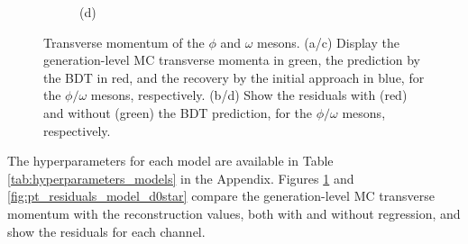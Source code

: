 \begin{figure}[!ht]
\begin{subfigure}[t]{0.50\mylength}
        \vspace*{-0.2cm}
        \caption{\footnotesize (d)}
    \end{subfigure}%
\caption{Transverse momentum of the $\phi$ and $\omega$ mesons. (a/c) Display the generation-level MC transverse momenta in green, the prediction by the BDT in red, and the recovery by the initial approach in blue, for the $\phi/\omega$ mesons, respectively. (b/d) Show the residuals with (red) and without (green) the BDT prediction, for the $\phi/\omega$ mesons, respectively.}
\label{fig:pt_residuals_model_omega_phi}
    \vspace*{-0.0cm}
\end{figure}

The hyperparameters for each model are available in Table \ref{tab:hyperparameters_models} in the Appendix. Figures \ref{fig:pt_residuals_model_omega_phi} and \ref{fig:pt_residuals_model_d0star} compare the generation-level MC transverse momentum with the reconstruction values, both with and without regression, and show the residuals for each channel.
